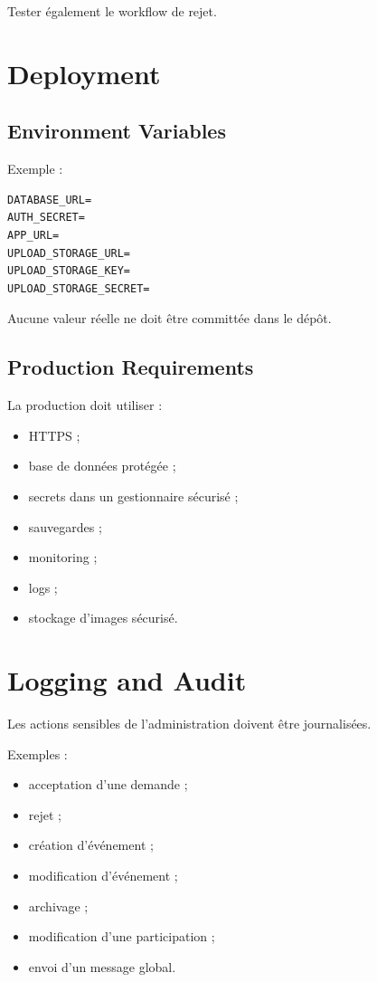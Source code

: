 \documentclass[11pt,a4paper]{report}
\begin{document}
Tester également le workflow de rejet.

\chapter{Deployment}

\section{Environment Variables}

Exemple :

\begin{lstlisting}
DATABASE_URL=
AUTH_SECRET=
APP_URL=
UPLOAD_STORAGE_URL=
UPLOAD_STORAGE_KEY=
UPLOAD_STORAGE_SECRET=
\end{lstlisting}

Aucune valeur réelle ne doit être committée dans le dépôt.

\section{Production Requirements}

La production doit utiliser :

\begin{itemize}
    \item HTTPS ;
    \item base de données protégée ;
    \item secrets dans un gestionnaire sécurisé ;
    \item sauvegardes ;
    \item monitoring ;
    \item logs ;
    \item stockage d'images sécurisé.
\end{itemize}

\chapter{Logging and Audit}

Les actions sensibles de l'administration doivent être journalisées.

Exemples :

\begin{itemize}
    \item acceptation d'une demande ;
    \item rejet ;
    \item création d'événement ;
    \item modification d'événement ;
    \item archivage ;
    \item modification d'une participation ;
    \item envoi d'un message global.
\end{itemize}
\end{document}
